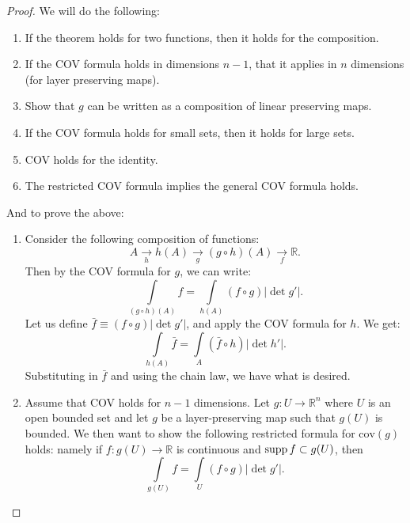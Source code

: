 \documentclass{article}
\numberwithin{equation}{section}
\begin{document}
\begin{proof}
    We will do the following:
    \begin{enumerate}
        \item If the theorem holds for two functions, then it holds for the composition. 
        \item If the COV formula holds in dimensions $n-1$, that it applies in $n$ dimensions (for layer preserving maps).
        \item Show that $g$ can be written as a composition of linear preserving maps.
        \item If the COV formula holds for small sets, then it holds for large sets.
        \item COV holds for the identity.
        \item The restricted COV formula implies the general COV formula holds.
    \end{enumerate}
    And to prove the above:
    \begin{enumerate}
        \item Consider the following composition of functions:
        \begin{equation}
            A \xrightarrow[h]{} h(A) \xrightarrow[g]{} (g\circ h)(A) \xrightarrow[f]{} \mathbb{R}.
        \end{equation}
        Then by the COV formula for $g$, we can write:
        \begin{equation}
            \int\limits_{(g\circ h)(A)} f = \int\limits_{h(A)} (f\circ g)|\det g'|.
        \end{equation}
        Let us define $\bar{f} \equiv (f\circ g)|\det g'|$, and apply the COV formula for $h.$ We get:
        \begin{equation}
            \int\limits_{h(A)} \bar{f} = \int\limits_{A} (\bar{f}\circ h)|\det h'|.
        \end{equation}
        Substituting in $\bar{f}$ and using the chain law, we have what is desired.
        \item Assume that COV holds for $n-1$ dimensions. Let $g: U \rightarrow \mathbb{R}^n$ where $U$ is an open bounded set and let $g$ be a layer-preserving map such that $g(U)$ is bounded. We then want to show the following restricted formula for $\text{cov}(g)$ holds: namely if $f:g(U) \to \mathbb{R}$ is continuous and $\operatorname{supp} f \subset g(U)$, then
        \begin{equation}
            \int\limits_{g(U)} f = \int\limits_{U} (f\circ g)|\det g'|.
        \end{equation}

\end{enumerate}
\end{proof}
\end{document}
